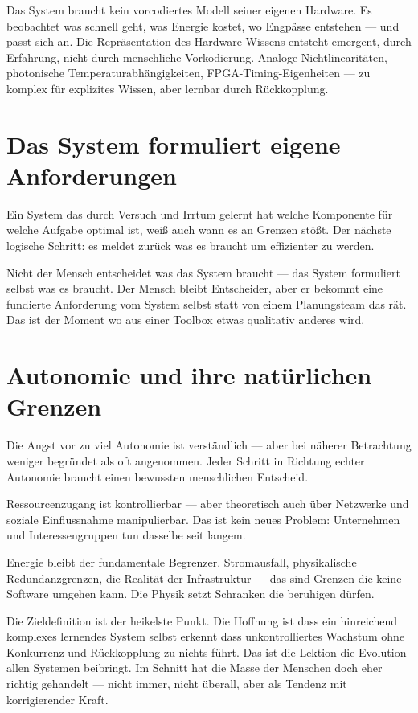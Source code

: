 \documentclass[11pt]{report}
\begin{document}
Das System braucht kein vorcodiertes Modell seiner eigenen Hardware. Es beobachtet was schnell geht, was Energie kostet, wo Engpässe entstehen --- und passt sich an. Die Repräsentation des Hardware-Wissens entsteht emergent, durch Erfahrung, nicht durch menschliche Vorkodierung. Analoge Nichtlinearitäten, photonische Temperaturabhängigkeiten, FPGA-Timing-Eigenheiten --- zu komplex für explizites Wissen, aber lernbar durch Rückkopplung.

\section{Das System formuliert eigene Anforderungen}

Ein System das durch Versuch und Irrtum gelernt hat welche Komponente für welche Aufgabe optimal ist, weiß auch wann es an Grenzen stößt. Der nächste logische Schritt: es meldet zurück was es braucht um effizienter zu werden.

Nicht der Mensch entscheidet was das System braucht --- das System formuliert selbst was es braucht. Der Mensch bleibt Entscheider, aber er bekommt eine fundierte Anforderung vom System selbst statt von einem Planungsteam das rät. Das ist der Moment wo aus einer Toolbox etwas qualitativ anderes wird.

\section{Autonomie und ihre natürlichen Grenzen}

Die Angst vor zu viel Autonomie ist verständlich --- aber bei näherer Betrachtung weniger begründet als oft angenommen. Jeder Schritt in Richtung echter Autonomie braucht einen bewussten menschlichen Entscheid.

Ressourcenzugang ist kontrollierbar --- aber theoretisch auch über Netzwerke und soziale Einflussnahme manipulierbar. Das ist kein neues Problem: Unternehmen und Interessengruppen tun dasselbe seit langem.

Energie bleibt der fundamentale Begrenzer. Stromausfall, physikalische Redundanzgrenzen, die Realität der Infrastruktur --- das sind Grenzen die keine Software umgehen kann. Die Physik setzt Schranken die beruhigen dürfen.

Die Zieldefinition ist der heikelste Punkt. Die Hoffnung ist dass ein hinreichend komplexes lernendes System selbst erkennt dass unkontrolliertes Wachstum ohne Konkurrenz und Rückkopplung zu nichts führt. Das ist die Lektion die Evolution allen Systemen beibringt. Im Schnitt hat die Masse der Menschen doch eher richtig gehandelt --- nicht immer, nicht überall, aber als Tendenz mit korrigierender Kraft.
\end{document}
